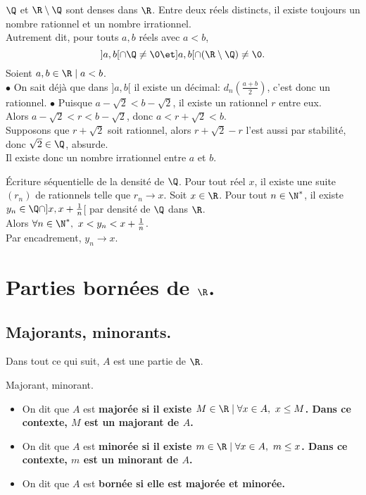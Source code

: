 \documentclass[11pt]{article}
\begin{document}
\begin{thm}{$\Q$ et $\R\setminus\Q$ sont denses dans $\R$.}{}
    Entre deux réels distincts, il existe toujours un nombre rationnel et un nombre irrationnel.\\
    Autrement dit, pour touts $a,b$ réels avec $a<b$,
    \begin{equation*}
        ]a,b[\cap\Q\neq\0\et]a,b[\cap(\R\setminus\Q)\neq\0.
    \end{equation*}
    \tcblower
    Soient $a,b\in\R\mid a<b$.\\
    $\bullet$ On sait déjà que dans $]a,b[$ il existe un décimal: $d_n(\frac{a+b}{2})$, c'est donc un rationnel.\n
    $\bullet$ Puisque $a-\sqrt{2}<b-\sqrt{2}$, il existe un rationnel $r$ entre eux.\\
    Alors $a-\sqrt{2}<r<b-\sqrt{2}$, donc $a<r+\sqrt{2}<b$.\\
    Supposons que $r+\sqrt{2}$ soit rationnel, alors $r+\sqrt{2}-r$ l'est aussi par stabilité, donc $\sqrt{2}\in\Q$, absurde.\\
    Il existe donc un nombre irrationnel entre $a$ et $b$.
\end{thm}

\begin{corr}{Écriture séquentielle de la densité de $\Q$.}{}
    Pour tout réel $x$, il existe une suite $(r_n)$ de rationnels telle que $r_n\to x$.
    \tcblower
    Soit $x\in\R$. Pour tout $n\in\N^*$, il existe $y_n\in\Q\cap]x,x+\frac{1}{n}$[ par densité de $\Q$ dans $\R$.\\
    Alors $\forall n\in\N^*, ~ x<y_n<x+\frac{1}{n}$.\\
    Par encadrement, $y_n\to x$. 
\end{corr}

\section{Parties bornées de \texorpdfstring{$\R$}{Lg}.}

\subsection{Majorants, minorants.}

Dans tout ce qui suit, $A$ est une partie de $\R$.

\begin{defi}{Majorant, minorant.}{}
    \begin{itemize}
        \item On dit que $A$ est \bf{majorée} si il existe $M\in\R\mid\forall x\in A,~ x\leq M$.
        Dans ce contexte, $M$ est un \bf{majorant} de $A$.
        \item On dit que $A$ est \bf{minorée} si il existe $m\in\R\mid\forall x\in A,~ m\leq x$.
        Dans ce contexte, $m$ est un \bf{minorant} de $A$.
        \item On dit que $A$ est \bf{bornée} si elle est majorée et minorée.
    \end{itemize}
\end{defi}
\end{document}
